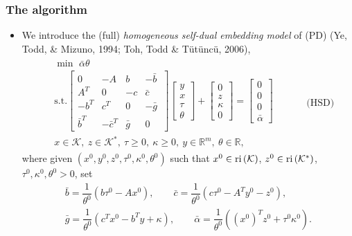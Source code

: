 \documentclass{beamer}
\def\interior{\protect{\textnormal{ri}}}
\begin{document}
\begin{frame}
	\frametitle{The algorithm}
	\begin{itemize}
		\item We introduce the (full) \textit{homogeneous self-dual embedding model} of (PD) (Ye, Todd, \& Mizuno, 1994; Toh, Todd \& T\"ut\"unc\"u, 2006),
		\begin{align*}
		\begin{split}
		& \min \,\, \bar{\alpha}\theta \\
		& \text{s.t.} \begin{bmatrix}
		0 & -A & b & -\bar b\ \\ 
		A^T & 0 & -c & \bar c \\
		-b^T & c^T& 0 & -\bar g \\
		\bar b^T & -\bar c^T & \bar g & 0
		\end{bmatrix}
		\begin{bmatrix}
		y \\ x \\ \tau \\ \theta
		\end{bmatrix} + 
		\begin{bmatrix}
		0 \\ z \\ \kappa \\ 0 
		\end{bmatrix} = 
		\begin{bmatrix}
		0 \\ 0 \\ 0 \\ \bar \alpha
		\end{bmatrix}\\
		& x \in \mathcal{K},\ z \in \mathcal{K}^*,\ \tau \geq 0,\ \kappa\geq 0,\ y \in \mathbb{R}^m,\ \theta \in \mathbb{R}, 
		\end{split} \quad \quad \quad \text{(HSD)}
		\end{align*}
		where given $(x^0, y^0, z^0, \tau^0, \kappa^0, \theta^0)$ such that $x^0 \in \interior \left(\mathcal{K}\right)$, $z^0 \in \interior \left(\mathcal{K}^*\right)$, $\tau^0, \kappa^0, \theta^0 > 0$, set
		\begin{align*}
		\bar b = \dfrac{1}{\theta^0}\left(b\tau^0 - Ax^0\right),\quad\quad  \bar c = \dfrac{1}{\theta^0}\left(c\tau^0 - A^Ty^0 - z^0\right), \\ 
		\bar g = \dfrac{1}{\theta^0}\left(c^T x^0 - b^T y + \kappa\right), \quad\quad  \bar \alpha = \dfrac{1}{\theta^0}\left((x^0)^T z^0 + \tau^0\kappa^0\right).
		\end{align*}
	\end{itemize}
\end{frame}
\end{document}
